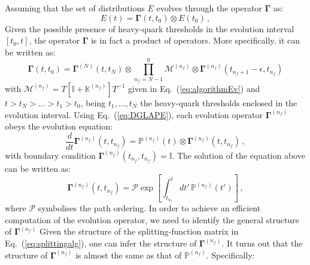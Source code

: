 \documentclass[10pt,a4paper]{article}
\begin{document}
Assuming that the set of distributions $E$ evolves through the
operator ${\bm\Gamma}$ as:
\begin{equation}
E(t) = {\bm\Gamma}(t,t_0)\otimes E(t_0)\,,
\end{equation}
Given the possible presence of heavy-quark thresholds in the evolution
interval $[t_0,t]$, the operator ${\bm\Gamma}$ is in fact a product of
operators. More specifically. it can be written as:
\begin{equation}\label{eq:conbevop}
{\bm\Gamma}(t,t_0)= {\bm\Gamma}^{(N)}(t,t_N) \otimes\prod_{n_f=N-1}^{0} \mathcal{M}^{(n_f)}\otimes{\bm\Gamma}^{(n_f)}(t_{n_f+1}-\epsilon,t_{n_f})
\end{equation}
with
$\mathcal{M}^{(n_f)} =
T\left[\mathbb{I}+\mathbb{K}^{(n_f)}\right]T^{-1}$
given in Eq.~(\ref{eq:algorithmEv}) and $t>t_N>\dots>t_1>t_0$, being
$t_1,\dots,t_N$ the heavy-quark thresholds enclosed in the evolution
interval. Using Eq.~(\ref{eq:DGLAPE}), each evolution operator
${\bm\Gamma}^{(n_f)}$ obeys the evolution equation:
\begin{equation}\label{eq:DGLAPG}
  \frac{d}{dt}{\bm\Gamma}^{(n_f)}(t,t_{n_f}) = \mathbb{P}^{(n_f)}(t)\otimes {\bm\Gamma}^{(n_f)}(t,t_{n_f})\,,
\end{equation}
with boundary condition
${\bm\Gamma}^{(n_f)}(t_{n_f},t_{n_f})=\mathbb{I}$. The solution of the
equation above can be written as:
\begin{equation}
  {\bm\Gamma}^{(n_f)}(t,t_{n_f}) = \mathcal{P}\exp\left[\int_{t_{n_f}}^tdt'\,\mathbb{P}^{(n_f)}(t')\right]\,,
\end{equation}
where $\mathcal{P}$ symbolises the path ordering. In order to achieve
an efficient computation of the evolution operator, we need to
identify the general structure of ${\bm \Gamma}^{(n_f)}$ Given the
structure of the splitting-function matrix in
Eq.~(\ref{eq:splittingalg}), one can infer the structure of
${\bm \Gamma}^{(n_f)}$. It turns out that the structure of
${\bm \Gamma^{(n_f)}}$ is almost the same as that of
$\mathbb{P}^{(n_f)}$. Specifically:
\end{document}
